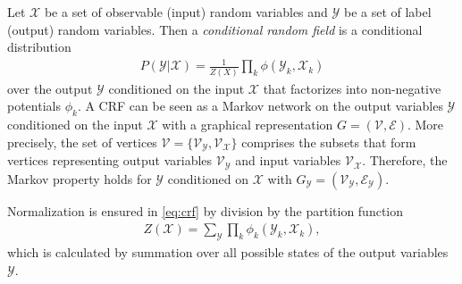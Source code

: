 \begin{mydef}
    \label{def:crf}
    Let $\mathcal{X}$ be a set of observable (input) random variables and $\mathcal{Y}$ be a set of
    label (output) random variables. Then a \emph{conditional random field} is a conditional
    distribution
    \begin{align}
        \label{eq:crf}
        P(\mathcal{Y}|\mathcal{X}) = \frac{1}{Z(X)}\prod_k\phi(\mathcal{Y}_k, \mathcal{X}_k)
    \end{align}
    over the output $\mathcal{Y}$ conditioned on the input $\mathcal{X}$ that factorizes into
    non-negative potentials $\phi_k$. A CRF can be seen as a Markov network on the output variables
    $\mathcal{Y}$ conditioned on the input $\mathcal{X}$ with a graphical representation
    $G=(\mathcal{V}, \mathcal{E})$. More precisely, the set of vertices
    $\mathcal{V}=\{\mathcal{V}_{\mathcal{Y}}, \mathcal{V}_{\mathcal{X}}\}$ comprises the subsets
    that form vertices representing output variables $\mathcal{V}_{\mathcal{Y}}$ and input variables
    $\mathcal{V}_{\mathcal{X}}$. Therefore, the Markov property holds for $\mathcal{Y}$ conditioned
    on $\mathcal{X}$ with $G_{\mathcal{Y}}=(\mathcal{V}_{\mathcal{Y}}, \mathcal{E}_{\mathcal{Y}})$.
\end{mydef}
Normalization is ensured in \cref{eq:crf} by division by the partition function
\begin{align}
    \label{eq:gm-crf-partition}
    Z(\mathcal{X}) = \sum_{\mathcal{Y}}\prod_k\phi_k(\mathcal{Y}_k, \mathcal{X}_k),
\end{align}
which is calculated by summation over all possible states of the output variables $\mathcal{Y}$.

